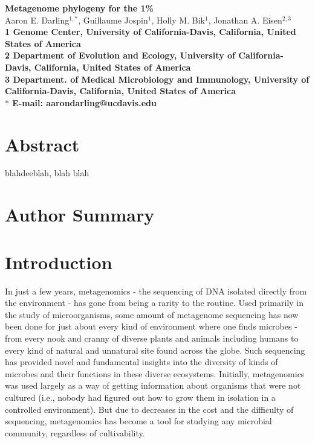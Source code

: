 \documentclass[10pt]{article}
\date{}
\begin{document}
\begin{flushleft}
{\Large
\textbf{Metagenome phylogeny for the 1\%}
}
\\
Aaron E. Darling$^{1,\ast}$,
Guillaume Jospin$^{1}$, 
Holly M. Bik$^{1}$,
Jonathan A. Eisen$^{2,3}$
\\
\bf{1} Genome Center, University of California-Davis, California, United States of America
\\
\bf{2} Department of Evolution and Ecology, University of California-Davis, California, United States of America
\\
\bf{3} Department. of Medical Microbiology and Immunology, University of California-Davis, California, United States of America
\\
$\ast$ E-mail: aarondarling@ucdavis.edu
\end{flushleft}

\section*{Abstract}
blahdeeblah, blah blah
\section*{Author Summary}

\section*{Introduction}

In just a few years, metagenomics - the sequencing of DNA isolated directly from the environment - has gone from being a rarity to the routine.  Used primarily in the study of microorganisms, some amount of metagenome sequencing has now been done for just about every kind of environment where one finds microbes - from every nook and cranny of diverse plants and animals including humans to every kind of natural and unnatural site found across the globe.  Such sequencing has provided novel and fundamental insights into the diversity of kinds of microbes and their functions in these diverse ecosystems.  Initially, metagenomics was used largely as a way of getting information about organisms that were not cultured (i.e., nobody had figured out how to grow them in isolation in a controlled environment).  But due to decreases in the cost and the difficulty of sequencing, metagenomics has become a tool for studying any microbial community, regardless of cultivability.  
\end{document}
